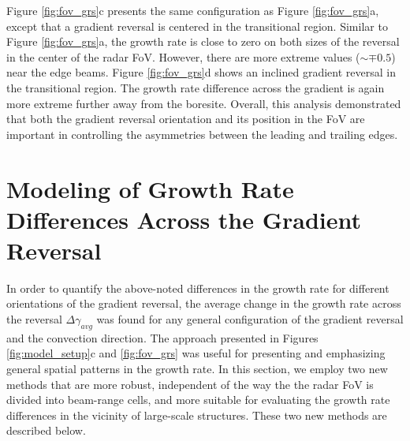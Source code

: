 Figure \ref{fig:fov_grs}c presents the same configuration as Figure \ref{fig:fov_grs}a, except that a gradient reversal is centered in the transitional region. Similar to Figure \ref{fig:fov_grs}a, the growth rate is close to zero on both sizes of the reversal in the center of the radar FoV.  However, there are more extreme values (\(\sim\mp0.5\)) near the edge beams.  Figure \ref{fig:fov_grs}d shows an inclined gradient reversal in the transitional region.  The growth rate difference across the gradient is again more extreme further away from the boresite. Overall, this analysis demonstrated that both the gradient reversal orientation and its position in the FoV are important in controlling the asymmetries between the leading and trailing edges.

\section{Modeling of Growth Rate Differences Across the Gradient Reversal}
\label{sec:model_reversal}
In order to quantify the above-noted differences in the growth rate for different orientations of the gradient reversal, the average change in the growth rate across the reversal \(\Delta\gamma_{avg}\) was found for any general configuration of the gradient reversal and the convection direction. The approach presented in Figures \ref{fig:model_setup}c and \ref{fig:fov_grs} was useful for presenting and emphasizing general spatial patterns in the growth rate. In this section, we employ two new methods that are more robust, independent of the way the the radar FoV is divided into beam-range cells, and more suitable for evaluating the growth rate differences in the vicinity of large-scale structures. These two new methods are described below.



